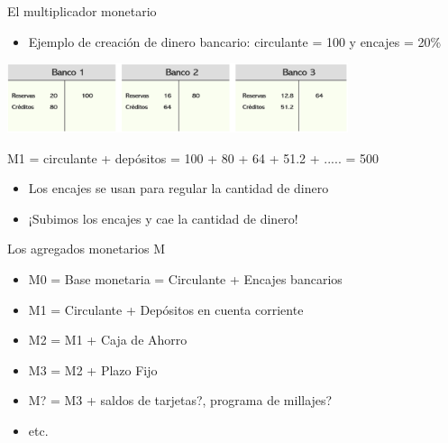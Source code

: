 \documentclass{beamer}
\begin{document}
\begin{frame}{El multiplicador monetario}
    \begin{itemize}
        \item Ejemplo de creación de dinero bancario:  circulante = 100  y  encajes = 20\%
    \end{itemize}
        \vspace{2mm}
    \centering\includegraphics[width=10cm]{Figures/P51.png}\
    \vspace{2mm}
    \begin{tcolorbox}[width=4in, interior hidden, boxsep=0pt,
                  left=0pt, halign=center, valign=center, right=0pt,
                  bottom=3pt, top=3pt, ]%
                 \footnotesize{M1 = circulante + depósitos = 100 + 80 + 64 + 51.2 + ..... = 500}
    \end{tcolorbox}
        \vspace{2mm}
    \begin{itemize}
        \item Los encajes se usan para regular la cantidad de dinero
        \item ¡Subimos los encajes y cae la cantidad de dinero!  \Large\Cooley[][yellow!60!white]
        \end{itemize}
\end{frame}


\begin{frame}{Los agregados monetarios M}
     \begin{itemize}
        \item M0 = Base monetaria = Circulante + Encajes bancarios
        \item M1 = Circulante + Depósitos en cuenta corriente
        \item M2 = M1 + Caja de Ahorro
        \item M3 = M2 + Plazo Fijo
        \item M? = M3 + saldos de tarjetas?, programa de millajes? 
        \item etc.
    \end{itemize}
\end{frame}
\end{document}
